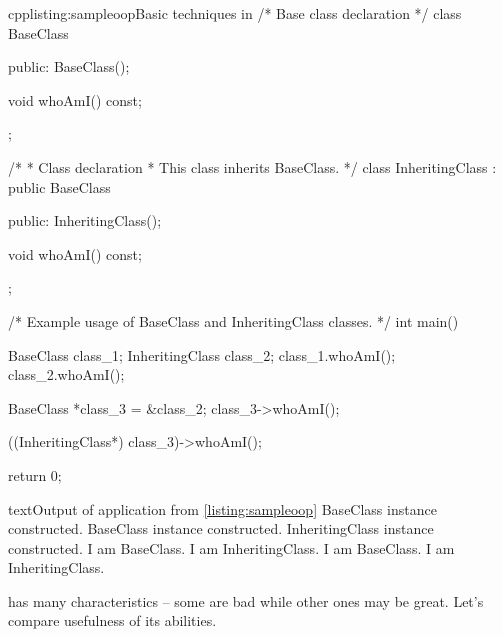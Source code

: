 \begin{fdoccode}{cpp}{listing:sampleoop}{Basic  techniques in \cpp}
/* Base class declaration */
class BaseClass {
    public:
		BaseClass();

		void whoAmI() const;
};

/*
 * Class declaration
 * This class inherits BaseClass.
 */
class InheritingClass : public BaseClass {
	public:
		InheritingClass();

		void whoAmI() const;
};

/* Example usage of BaseClass and InheritingClass classes. */
int main() {
    BaseClass class_1;
    InheritingClass class_2;
    class_1.whoAmI();
    class_2.whoAmI();

    BaseClass *class_3 = &class_2;
    class_3->whoAmI();

    ((InheritingClass*) class_3)->whoAmI();

    return 0;
}
\end{fdoccode}

\begin{fdoccode}{text}{}{Output of application from \autoref{listing:sampleoop}}
BaseClass instance constructed.
BaseClass instance constructed.
InheritingClass instance constructed.
I am BaseClass.
I am InheritingClass.
I am BaseClass.
I am InheritingClass.
\end{fdoccode}

\cpp has many characteristics -- some are bad while other ones may be great. Let's compare usefulness of its abilities.

